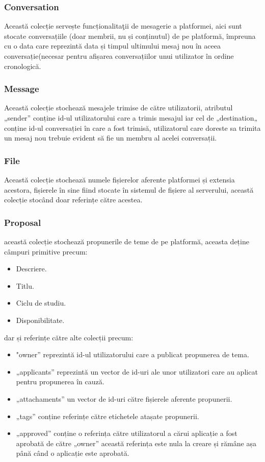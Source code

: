 \documentclass[12pt,a4paper,hidelinks]{report}
\theoremstyle{definition}
\theoremstyle{remark}
\begin{document}
\subsubsection{Conversation}
Această colecție servește funcționalita\c tii de mesagerie a platformei, aici sunt stocate conversațiile (doar membrii, nu și conținutul) de pe platformă, împreuna cu o data care reprezintă data și timpul ultimului mesaj nou în aceea conversație(necesar pentru afișarea conversațiilor unui utilizator în ordine cronologică.
\subsubsection{Message}
Această colecție stochează mesajele trimise de către utilizatorii, atributul „sender” conține id-ul utilizatorului care a trimis mesajul iar cel de „destination„ conține id-ul conversației în care a fost trimisă, utilizatorul   care doreste sa trimita un mesaj nou trebuie evident să fie un membru al acelei conversații.
\subsubsection{File}
Această colecție stochează numele fișierelor aferente platformei și extensia acestora, fișierele în sine fiind stocate în sistemul de fișiere al serverului, această colecție stocând doar referințe către acestea.
\subsubsection{Proposal}
această colecție stochează propunerile de teme de pe platformă, aceasta deține câmpuri primitive precum:
\begin{itemize}
    \item Descriere.
    \item Titlu.
    \item Ciclu de studiu.
    \item Disponibilitate.
\end{itemize}
dar și referințe către alte colecții precum:
\begin{itemize}
    \item "owner” reprezintă id-ul utilizatorului care a publicat propunerea de tema.
    \item „applicants” reprezintă un vector de id-uri ale unor utilizatori care au aplicat pentru propunerea în cauză.
    \item „attachaments” un vector de id-uri către fișierele aferente propunerii.
    \item „tags” conține referințe către etichetele atașate propunerii.
    \item „approved” conține o referința către utilizatorul a cărui aplicație a fost aprobată de către „owner” această referința este nula la creare și rămâne așa până când o aplicație este aprobată.
\end{itemize}
%
%
\end{document}
